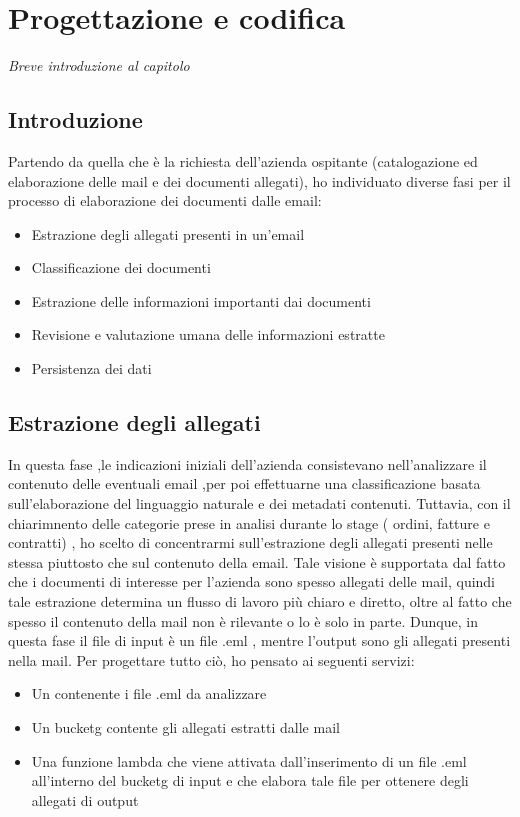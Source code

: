 \chapter{Progettazione e codifica}
\label{cap:progettazione-codifica}

\emph{Breve introduzione al capitolo}

\section{Introduzione}

Partendo da quella che è la richiesta dell'azienda ospitante (catalogazione ed elaborazione delle mail e dei documenti allegati), ho individuato diverse fasi per il processo di elaborazione dei documenti dalle email: 
\begin{itemize}
  \item Estrazione degli allegati presenti in un'email
  \item Classificazione dei documenti
  \item Estrazione delle informazioni importanti dai documenti
  \item  Revisione e valutazione umana delle informazioni estratte
  \item Persistenza dei dati
\end{itemize}

\section{Estrazione degli allegati}
\label{sec:estrazione-allegati}
In questa fase ,le indicazioni iniziali dell'azienda consistevano nell'analizzare il contenuto delle eventuali  email ,per poi effettuarne una classificazione basata sull'elaborazione del linguaggio naturale e dei metadati contenuti. Tuttavia, con il chiarimnento delle categorie prese in analisi durante lo stage ( ordini, fatture e contratti) , ho scelto di concentrarmi sull'estrazione degli allegati presenti nelle stessa piuttosto che sul contenuto della email. 
Tale visione è supportata dal fatto che i documenti di interesse per l'azienda sono spesso allegati delle mail, quindi  tale estrazione determina un flusso di lavoro più chiaro e diretto, oltre al fatto che spesso il contenuto della mail non è rilevante o lo è solo in parte.
Dunque, in questa fase il file di input è un file .eml , mentre l'output sono gli allegati presenti nella mail. Per progettare tutto ciò, ho pensato ai seguenti servizi:
\begin{itemize}
    \item Un  contenente i file .eml da analizzare
    \item Un \gls{bucketg} contente gli allegati estratti dalle mail 
    \item Una funzione lambda che viene attivata dall'inserimento di un file .eml all'interno del \gls{bucketg} di input e che elabora tale file per ottenere degli allegati di output
\end{itemize}

